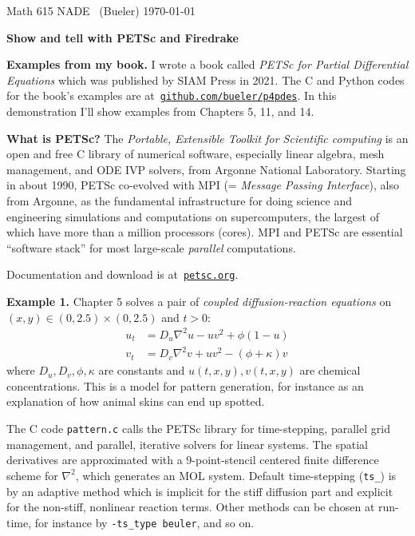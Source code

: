 \documentclass[12pt]{amsart}
\newcommand{\normalspacing}{\renewcommand{\baselinestretch}{1.05}
        \tiny\normalsize}
\newcommand{\grad}{\nabla}
\begin{document}
\scriptsize%
\noindent Math 615 NADE \, (Bueler) \hfill  \today
\normalsize\bigskip
\normalspacing

\Large\centerline{\textbf{Show and tell with \textbf{PETSc} and \textbf{Firedrake}}}
\normalsize

\bigskip
\thispagestyle{empty}
\normalspacing

\renewcommand{\labelenumi}{\arabic{enumi}.\,}


\bigskip
\noindent \textbf{Examples from my book.}  I wrote a book called \emph{PETSc for Partial Differential Equations} which was published by SIAM Press in 2021.  The C and Python codes for the book's examples are at \,\href{https://github.com/bueler/p4pdes}{\texttt{github.com/bueler/p4pdes}}.  In this demonstration I'll show examples from Chapters 5, 11, and 14.

\medskip
\noindent \textbf{What is PETSc?}  The \emph{Portable, Extensible Toolkit for Scientific computing} is an open and free C library of numerical software, especially linear algebra, mesh management, and ODE IVP solvers, from Argonne National Laboratory.  Starting in about 1990, PETSc co-evolved with MPI (= \emph{Message Passing Interface}), also from Argonne, as the fundamental infrastructure for doing science and engineering simulations and computations on supercomputers, the largest of which have more than a million processors (cores).  MPI and PETSc are essential ``software stack'' for most large-scale \emph{parallel} computations.

Documentation and download is at \,\href{https://petsc.org/}{\texttt{petsc.org}}.

\bigskip
\noindent \textbf{Example 1.}  Chapter 5 solves a pair of \emph{coupled diffusion-reaction equations} on $(x,y) \in (0,2.5)\times (0,2.5)$ and $t>0$:
\begin{align*}
u_t &= D_u \grad^2 u - u v^2 + \phi (1 - u) \\
v_t &= D_v \grad^2 v + u v^2 - (\phi + \kappa) v
\end{align*}
where $D_u,D_v,\phi,\kappa$ are constants and $u(t,x,y),v(t,x,y)$ are chemical concentrations.  This is a model for pattern generation, for instance as an explanation of how animal skins can end up spotted.

The C code \texttt{pattern.c} calls the PETSc library for time-stepping, parallel grid management, and parallel, iterative solvers for linear systems.  The spatial derivatives are approximated with a 9-point-stencil centered finite difference scheme for $\nabla^2$, which generates an MOL system.  Default time-stepping (\texttt{ts\_}) is by an adaptive method which is implicit for the stiff diffusion part and explicit for the non-stiff, nonlinear reaction terms.  Other methods can be chosen at run-time, for instance by \texttt{-ts\_type beuler}, and so on.
\end{document}
